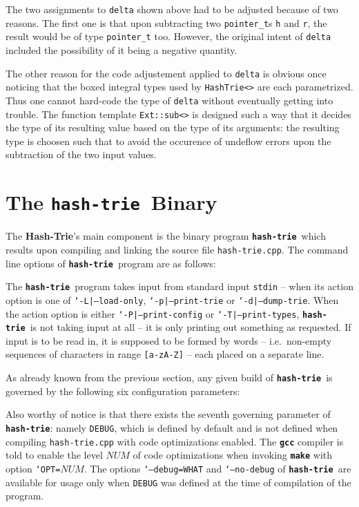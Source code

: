 \documentclass[a4paper,11pt]{article}
\renewcommand{\=}{\protect\nobreakdash-\hspace{0pt}}
\renewcommand{\~}{\protect\nobreakdash--\hspace{0pt}}
\newcommand{\Hashtrie}{Hash\=\!Trie}
\newcommand{\HashTrie}{\textbf{\Hashtrie}}
\newcommand\HashTrie*{Hash\hspace{-.105em}Trie}
\newcommand{\hashtrie}{{\tt\textbf{hash-trie}}}
\newcommand\hashtrie*{\emph{hash\=trie}}
\newcommand{\ie}{i.e.}
\newcommand{\opt}[1]{\nohyphens{\tt{`#1\textquotesingle}}}
\newcommand{\code}[1]{{\tt{#1}}}
\newcommand\code*[1]{\mbox{\code{#1}}}
\newcommand{\prog}[1]{{\tt\textbf{#1}}}
\newcommand{\helplisting}[1]{%
	\begin{spacing}{1.05}%
	\newcommand{\postbreak}{%
		\raisebox{0ex}[0ex][0ex]{%
			\ensuremath{\hspace{14em}\hookrightarrow\hspace{2pt}}}}
	\label{#1}
	\end{spacing}%
}
\begin{document}
The two assignments to \code{delta} shown above had to be adjusted because of
two reasons. The first one is that upon subtracting two \code{pointer\_t}s
\code{h} and \code{r}, the result would be of type \code{pointer\_t} too.
However, the original intent of \code{delta} included the possibility of it
being a negative quantity. 

The other reason for the code adjustement applied to \code{delta} is obvious
once noticing that the boxed integral types used by \code{HashTrie<>} are each
parametrized. Thus one cannot hard-code the type of \code{delta} without
eventually getting into trouble. The function template \code{Ext::sub<>}
is designed such a way that it decides the type of its resulting value based
on the type of its arguments: the resulting type is choosen such that to avoid
the occurence of undeflow errors upon the subtraction of the two input
values.
%
\section{The \hashtrie\ Binary}
%
The \HashTrie's main component is the binary program \hashtrie\ which
results upon compiling and linking the source file \code{hash-trie.cpp}.
%
The command line options of \hashtrie\ program are as follows:
%
\helplisting{hash-trie}
%
The \hashtrie\ program takes input from standard input \code{stdin} -- when its
action option is one of
\opt{-L|--load-only},
\opt{-p|--print-trie} or
\opt{-d|--dump-trie}.
When the action option is either
\opt{-P|--print-config} or
\opt{-T|--print-types},
\hashtrie\ is not taking input at all -- it is only printing out something as
requested.
If input is to be read in, it is supposed to be formed by words -- \ie\ 
non-empty sequences of characters in range \code{[a-zA-Z]} -- each placed on a
separate line.

\label{hash-trie-config-params-begin}
As already known from the previous section, any given build of \hashtrie\ is
governed by the following six configuration parameters:
%
%
Also worthy of notice is that there exists the seventh governing parameter of
\hashtrie: namely \code{DEBUG}, which is defined by default and is not defined
when compiling \code{hash-trie.cpp} with code optimizations enabled. The \prog{gcc}
compiler is told to enable the level \code{$NUM$} of code optimizations when invoking
\prog{make} with option \opt{OPT=$NUM$}.
The options \opt{--debug=WHAT} and \opt{--no-debug} of \hashtrie\ are available
for usage only when \code{DEBUG} was defined at the time of compilation of the
program.
\end{document}

